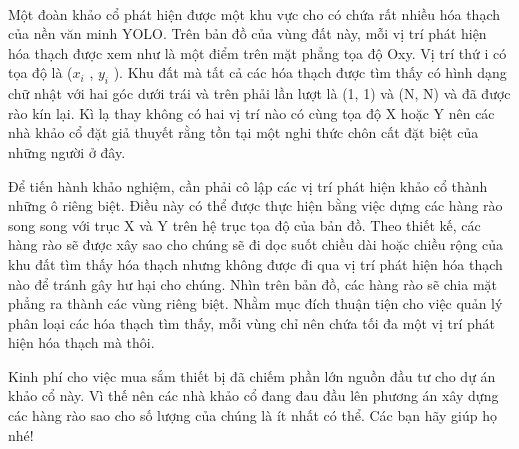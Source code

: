  

Một đoàn khảo cổ phát hiện được một khu vực cho có chứa rất nhiều hóa thạch của nền văn minh YOLO. Trên bản đồ của vùng đất này, mỗi vị trí phát hiện hóa thạch được xem như là một điểm trên mặt phẳng tọa độ Oxy. Vị trí thứ i có tọa độ là ($x_{i}$ , $y_{i}$ ). Khu đất mà tất cả các hóa thạch được tìm thấy có hình dạng chữ nhật với hai góc dưới trái và trên phải lần lượt là (1, 1) và (N, N) và đã được rào kín lại. Kì lạ thay không có hai vị trí nào có cùng tọa độ X hoặc Y nên các nhà khảo cổ đặt giả thuyết rằng tồn tại một nghi thức chôn cất đặt biệt của những người ở đây.

Để tiến hành khảo nghiệm, cần phải cô lập các vị trí phát hiện khảo cổ thành những ô riêng biệt. Điều này có thể được thực hiện bằng việc dựng các hàng rào song song với trục X và Y trên hệ trục tọa độ của bản đồ. Theo thiết kế, các hàng rào sẽ được xây sao cho chúng sẽ đi dọc suốt chiều dài hoặc chiều rộng của khu đất tìm thấy hóa thạch nhưng không được đi qua vị trí phát hiện hóa thạch nào để tránh gây hư hại cho chúng. Nhìn trên bản đồ, các hàng rào sẽ chia mặt phẳng ra thành các vùng riêng biệt. Nhằm mục đích thuận tiện cho việc quản lý phân loại các hóa thạch tìm thấy, mỗi vùng chỉ nên chứa tối đa một vị trí phát hiện hóa thạch mà thôi.

Kinh phí cho việc mua sắm thiết bị đã chiếm phần lớn nguồn đầu tư cho dự án khảo cổ này. Vì thế nên các nhà khảo cổ đang đau đầu lên phương án xây dựng các hàng rào sao cho số lượng của chúng là ít nhất có thể. Các bạn hãy giúp họ nhé!
\begin{itemize}
\end{itemize}